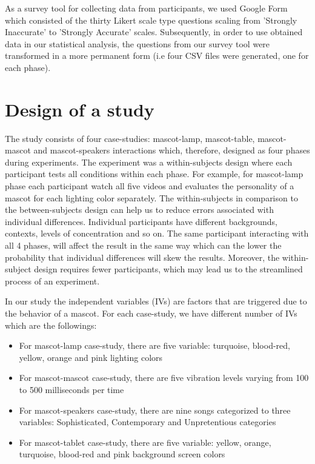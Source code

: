 As a survey tool for collecting data from participants, we used Google Form which consisted
of the thirty Likert scale type questions scaling from 'Strongly Inaccurate' to 'Strongly Accurate' scales.
Subsequently, in order to use obtained data in our statistical analysis, the questions
from our survey tool were transformed in a more permanent form (i.e four CSV files were generated, one for each phase).

\section{Design of a study}
\label{sec:design-of-a-study}
The study consists of four case-studies: mascot-lamp, mascot-table, mascot-mascot and mascot-speakers
interactions which, therefore, designed as four phases during experiments.
The experiment was a within-subjects design where each participant tests all conditions within each phase.
For example, for mascot-lamp phase each participant watch all five videos and
evaluates the personality of a mascot for each lighting color separately.
The within-subjects in comparison to the between-subjects design can help us to
reduce errors associated with individual differences.
Individual participants have different backgrounds, contexts, levels of concentration and so on.
The same participant interacting with all 4 phases, will affect the result in the same way
which can the lower the probability that individual differences will skew the results.
Moreover, the within-subject design requires fewer participants, which may lead
us to the streamlined process of an experiment.

In our study the independent variables (IVs) are factors that are triggered due to the behavior of a mascot.
For each case-study, we have different number of IVs which are the followings:
\begin{itemize}
  \item For mascot-lamp case-study, there are five variable: turquoise, blood-red, yellow, orange and pink lighting colors
  \item For mascot-mascot case-study, there are five vibration levels varying from 100 to 500 milliseconds per time
  \item For mascot-speakers case-study, there are nine songs categorized to three variables:
        Sophisticated, Contemporary and Unpretentious categories
   \item For mascot-tablet case-study, there are five variable: yellow, orange, turquoise,
        blood-red and pink background screen colors
\end{itemize}

